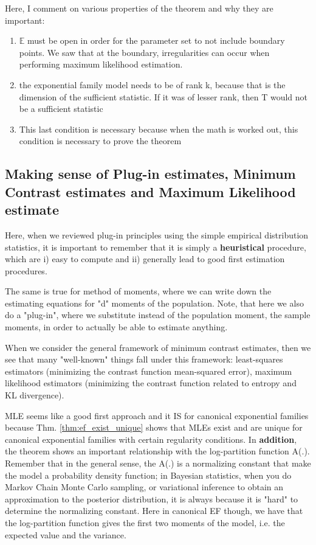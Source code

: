 		Here, I comment on various properties of the theorem and why they are important:

		\begin{enumerate}
			\item $\mathbb{E}$ must be open in order for the parameter set to not include boundary points. We saw that at the boundary, irregularities can occur when performing maximum likelihood estimation.
			\item the exponential family model needs to be of rank k, because that is the dimension of the sufficient statistic. If it was of lesser rank, then T would not be a sufficient statistic
			\item This last condition is necessary because when the math is worked out, this condition is necessary to prove the theorem
		\end{enumerate}

	\subsection{Making sense of Plug-in estimates, Minimum Contrast estimates and Maximum Likelihood estimate}
		
		Here, when we reviewed plug-in principles using the simple empirical distribution statistics, it is important to remember that it is simply a \textbf{heuristical} procedure, which are i) easy to compute and ii) generally lead to good first estimation procedures. 

		The same is true for method of moments, where we can write down the estimating equations for "d" moments of the population. Note, that here we also do a "plug-in", where we substitute instead of the population moment, the sample moments, in order to actually be able to estimate anything.

		When we consider the general framework of minimum contrast estimates, then we see that many "well-known" things fall under this framework: least-squares estimators (minimizing the contrast function mean-squared error), maximum likelihood estimators (minimizing the contrast function related to entropy and KL divergence).

		MLE seems like a good first approach and it IS for canonical exponential families because Thm. \ref{thm:ef_exist_unique} shows that MLEs exist and are unique for canonical exponential families with certain regularity conditions. In \textbf{addition}, the theorem shows an important relationship with the log-partition function A(.). Remember that in the general sense, the A(.) is a normalizing constant that make the model a probability density function; in Bayesian statistics, when you do Markov Chain Monte Carlo sampling, or variational inference to obtain an approximation to the posterior distribution, it is always because it is "hard" to determine the normalizing constant. Here in canonical EF though, we have that the log-partition function gives the first two moments of the model, i.e. the expected value and the variance.

